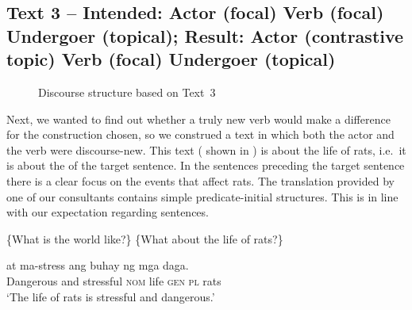 \documentclass[output=paper,
,modfonts
,nonflat]{langsci/langscibook}
\begin{document}
  
\subsection{Text 3 -- Intended: Actor (focal) Verb (focal) Undergoer (topical); Result: Actor (contrastive topic) Verb (focal) Undergoer (topical)}

\begin{figure}
\caption{Discourse structure based on Text~3}
\label{fig:text3_analysis}
\end{figure}

\noindent Next, we wanted to find out whether a truly new verb would make a difference for the construction chosen, so we construed a text in which both the actor and the verb were discourse-new. This text ( shown in ) is about the life of rats, i.e.\ it is about the  of the target sentence.  In the sentences preceding the target sentence there is a clear focus on the events that affect rats. The translation provided by one of our consultants contains simple predicate-initial structures. This is in line with our expectation regarding  sentences.

\begin{exe}
\ex \label{text3_part1}
\begin{xlist}
 \{What is the world like?\}
 \{What about the life of rats?\}
\end{xlist}
\begin{xlist}[{>}> A\textsubscript{{0.1}}:]
 at {ma-stress{\cb}\focus} {{\ob}ang} buhay  ng mga {daga{\cb}\topic{\cb}\sq}.\\
{\void{[}Dangerous} and stressful \textsc{\void{[}nom} life \textsc{gen} \textsc{pl} rats\\
\glt `The life of rats is stressful and dangerous.'
\end{xlist}
\end{exe}
\end{document}
